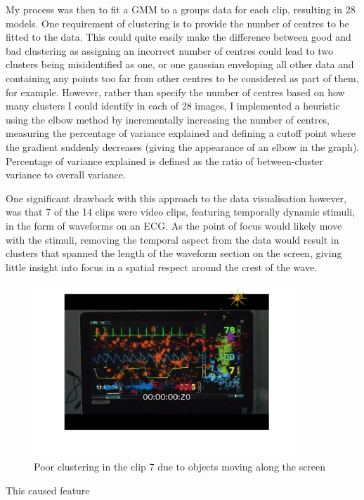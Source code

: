 \documentclass{report}
\begin{document}
{				My process was then to fit a GMM to a groups data for each clip, resulting in 28 models. One requirement of clustering is to provide the number of centres to be fitted to the data. This could quite easily make the difference between good and bad clustering as assigning an incorrect number of centres could lead to two clusters being misidentified as one, or one gaussian enveloping all other data and containing any points too far from other centres to be considered as part of them, for example. However, rather than specify the number of centres based on how many clusters I could identify in each of 28 images, I implemented a heuristic using the elbow method by incrementally increasing the number of centres, measuring the percentage of variance explained and defining a cutoff point where the gradient suddenly decreases (giving the appearance of an elbow in the graph). Percentage of variance explained is defined as the ratio of between-cluster variance to overall variance.
				
				One significant drawback with this approach to the data visualisation however, was that 7 of the 14 clips were video clips, featuring temporally dynamic stimuli, in the form of waveforms on an ECG. As the point of focus would likely move with the stimuli, removing the temporal aspect from the data would result in clusters that spanned the length of the waveform section on the screen, giving little insight into focus in a spatial respect around the crest of the wave.
				\begin{figure}[h]
					\includegraphics[width=10cm]{videocluster}
					\centering
					\caption{Poor clustering in the clip 7 due to objects moving along the screen}
				\end{figure}
				This caused feature
		\newpage
}
\end{document}
